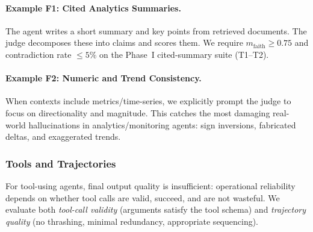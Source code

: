 \documentclass[11pt]{article}
\begin{document}
\paragraph{Example F1: Cited Analytics Summaries.}
The agent writes a short summary and key points from retrieved documents.
The judge decomposes these into claims and scores them.
We require $m_{\text{faith}} \ge 0.75$ and contradiction rate $\le 5\%$ on the Phase~I cited-summary suite (T1--T2).

\paragraph{Example F2: Numeric and Trend Consistency.}
When contexts include metrics/time-series, we explicitly prompt the judge to focus on directionality and magnitude.
This catches the most damaging real-world hallucinations in analytics/monitoring agents: sign inversions, fabricated deltas, and exaggerated trends.

\subsubsection{Tools and Trajectories}

For tool-using agents, final output quality is insufficient: operational reliability depends on whether tool calls are valid, succeed, and are not wasteful.
We evaluate both \emph{tool-call validity} (arguments satisfy the tool schema) and \emph{trajectory quality} (no thrashing, minimal redundancy, appropriate sequencing).
\end{document}
